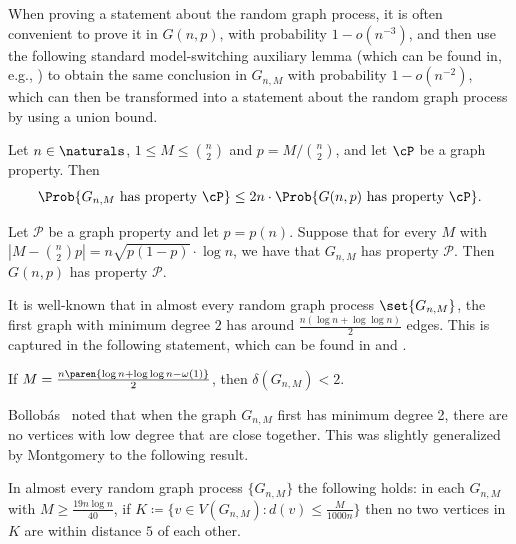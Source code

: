\documentclass[10pt,a4paper,reqno]{amsart}
\begin{document}
When proving a statement about the random graph process, it is often convenient to prove it in $G(n, p)$, with probability $1 - o(n^{-3})$, and then use the following standard model-switching auxiliary lemma (which can be found in, e.g., \cite{MR1864966}) to obtain the same conclusion in $G_{n,M}$ with probability $1 - o(n^{-2})$, which can then be transformed into a statement about the random graph process \whp by using a union bound.

\begin{lemma}[\cite{MR1864966}]
  \label{lemma:model-switching}
  Let $n \in \naturals$, $1 \leq M \leq \binom{n}{2}$ and $p = M /
  \binom{n}{2}$, and let $\cP$ be a graph property. Then
  \begin{equation*}
    \Prob{G_{n,M} \text{ has property } \cP} \leq 2n \cdot \Prob{G(n, p)
      \text{ has property } \cP}.
  \end{equation*}
\end{lemma}

\begin{lemma}\label{thm:equivalence_Gnp_Gnm}
    Let $\mathcal{P}$ be a graph property and let $p = p(n)$. Suppose that for every $M$ with $|M - \binom{n}{2}p| = n\sqrt{p(1-p)} \cdot \log n$, we have that \whp $G_{n,M}$ has property $\mathcal{P}$. Then \whp $G(n,p)$ has property $\mathcal{P}$.
\end{lemma}

It is well-known that in almost every random graph process $\set{G_{n,M}}$, the first graph with minimum degree $2$ has around $\frac{n(\log n + \log\log n)}{2}$ edges. This is captured in the following statement, which can be found in \cite[Theorems~2.2(ii) and~3.5]{MR1864966} and \cite[Lemma~6.2]{Montgomery2019resilient}.

\begin{lemma}[\cite{MR1864966}]
  \label{lem:few_edges_GnM_degree_less_2}
  If $M = \frac{n\paren{\log n + \log \log n - \omega(1)}}{2}$, then
  \whp $\delta(G_{n, M}) < 2$.
\end{lemma}

Bollob\'as~\cite{bollobas1984evolution} noted that when the graph $G_{n,M}$ first has minimum degree 2, there are no vertices with low degree that are close together. This was slightly generalized by Montgomery to the following result.
\begin{lemma}\label{lem:small_deg_vertex_separation_in_G_{n,M}}
    In almost every random graph process $\{G_{n,M}\}$ the following holds: in each $G_{n,M}$ with $M \ge \frac{19n\log{n}}{40}$, if ${K \coloneqq \{v \in V(G_{n,M}) : d(v) \le \frac{M}{1000n}\}}$ then no two vertices in $K$ are within distance $5$ of each other.
\end{lemma}
\end{document}
